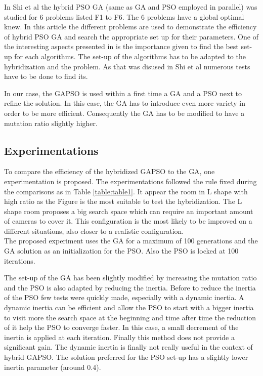 In Shi et al \cite{77*shi2005} the hybrid PSO GA (same as GA and PSO employed in parallel) was studied for 6  problems listed F1 to F6. The 6 problems have a global optimal knew.  In this article \cite{77*shi2005} the different problems are used to demonstrate the efficiency of hybrid PSO GA and search the appropriate set up for their parameters. One of the interesting aspects presented in \cite{77*shi2005} is the importance given to find  the best set-up for each algorithms. 
The set-up of the algorithms has to be adapted to the hybridization and the problem. As that was disused in Shi et al \cite{77*shi2005} numerous tests have to be done to find its.

 In our case, the GAPSO is used within a first time a GA and a PSO next to refine the solution. In this case, the GA has to introduce even more variety in order to be more efficient. Consequently the GA has to be modified to have a mutation ratio slightly higher.   



\subsection{Experimentations }
To compare the efficiency of the hybridized GAPSO to the GA, one experimentation is proposed.
The experimentations followed the rule fixed during the comparisons as in Table \ref{table:table1}. %
It appear the  room in L shape with high ratio as the Figure  is the most suitable to test the hybridization.  %
The L shape room proposes a big search space which can require an important amount of cameras to cover it. This configuration is the most likely to be improved on a different situations, also closer to a realistic configuration.\\
The proposed experiment uses the GA for a maximum of 100 generations and the GA solution as an initialization for the PSO. Also the PSO is locked at 100 iterations. %

The set-up of the GA has been slightly modified by increasing the mutation ratio and the PSO is also adapted by reducing the inertia.
 Before to reduce the inertia of the PSO few tests were quickly made, especially with a dynamic inertia. A dynamic inertia can be efficient and allow the PSO to start with a bigger inertia to visit more the search space at the beginning and time after time the reduction of it help the PSO to converge faster. In this case, a small decrement of the inertia is applied at each iteration. Finally this method does not provide a significant gain. The dynamic inertia is finally  not really useful in the context of hybrid GAPSO. The solution  preferred for the PSO set-up has a slightly lower inertia parameter (around 0.4).

